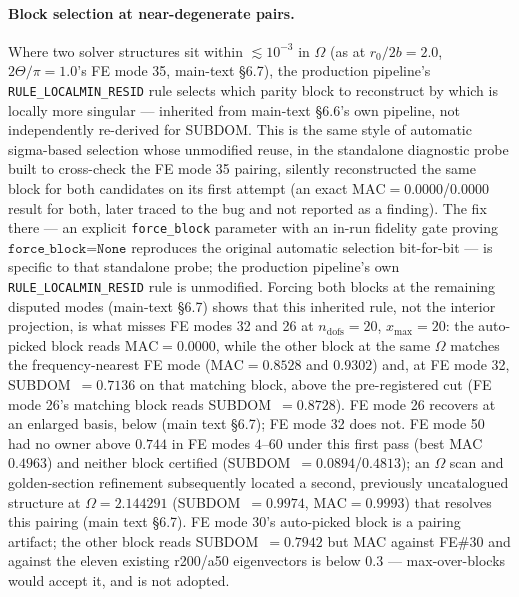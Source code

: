\documentclass[11pt]{article}
\begin{document}
\paragraph{Block selection at near-degenerate pairs.} Where two solver
structures sit within $\lesssim10^{-3}$ in $\Omega$ (as at
$r_0/2b=2.0$, $2\Theta/\pi=1.0$'s FE mode 35, main-text \S6.7), the
production pipeline's \texttt{RULE\_LOCALMIN\_RESID} rule selects which
parity block to reconstruct by which is locally more singular ---
inherited from main-text \S6.6's own pipeline, not independently
re-derived for SUBDOM. This is the same style of automatic
sigma-based selection whose unmodified reuse, in the standalone
diagnostic probe built to cross-check the FE mode 35 pairing, silently
reconstructed the same block for both candidates on its first attempt (an
exact $\mathrm{MAC}=0.0000$/$0.0000$ result for both, later traced to the
bug and not reported as a finding). The fix there --- an explicit
\texttt{force\_block} parameter with an in-run fidelity gate proving
$\texttt{force\_block=None}$ reproduces the original automatic selection
bit-for-bit --- is specific to that standalone probe; the production
pipeline's own \texttt{RULE\_LOCALMIN\_RESID} rule is unmodified. Forcing
both blocks at the remaining disputed modes (main-text \S6.7) shows that
this inherited rule, not the interior projection, is what misses FE
modes 32 and 26 at $n_{\mathrm{dofs}}=20$, $x_{\max}=20$: the
auto-picked block reads $\mathrm{MAC}=0.0000$,
while the other block at the same $\Omega$ matches the frequency-nearest
FE mode ($\mathrm{MAC}=0.8528$ and $0.9302$) and, at FE mode 32,
SUBDOM~$=0.7136$ on that matching block, above the pre-registered cut
(FE mode 26's matching block reads SUBDOM~$=0.8728$). FE mode 26
recovers at an enlarged basis, below (main text \S6.7); FE mode 32
does not. FE mode 50 had no
owner above $0.744$ in FE modes $4$--$60$ under this first pass (best MAC
$0.4963$) and neither block certified (SUBDOM~$=0.0894$/$0.4813$); an
$\Omega$ scan and golden-section refinement subsequently located a
second, previously uncatalogued structure at $\Omega=2.144291$
(SUBDOM~$=0.9974$, $\mathrm{MAC}=0.9993$) that resolves this pairing
(main text \S6.7). FE mode 30's
auto-picked block is a pairing artifact; the other block reads
SUBDOM~$=0.7942$ but MAC against FE\#30 and against the eleven existing
r200/a50 eigenvectors is below $0.3$ --- max-over-blocks would accept
it, and is not adopted.
\end{document}
